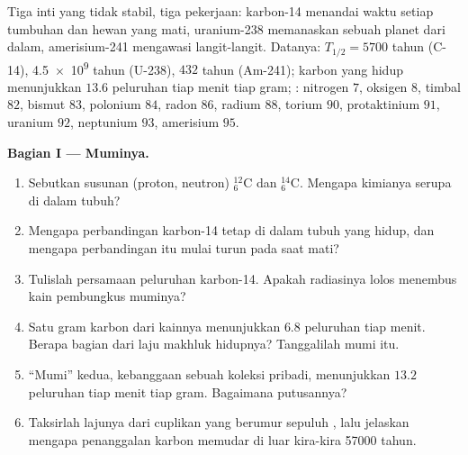 \begin{problem}
\label{pb:g11:nucleus-radioactivity:1}
Tiga inti yang tidak stabil, tiga pekerjaan: karbon-14 menandai waktu setiap
tumbuhan dan hewan yang mati, uranium-238 memanaskan sebuah planet dari
dalam, amerisium-241 mengawasi langit-langit. Datanya:
$T_{1/2} = \num{5700}$ tahun (C-14), \num{4.5e9} tahun (U-238), $432$ tahun
(Am-241); karbon yang hidup menunjukkan $13.6$ peluruhan tiap menit tiap
gram; : nitrogen $7$, oksigen $8$, timbal $82$, bismut $83$,
polonium $84$, radon $86$, radium $88$, torium $90$, protaktinium $91$,
uranium $92$, neptunium $93$, amerisium $95$.

\medskip
\noindent\textbf{Bagian I --- Muminya.}
\begin{enumerate}
  \item Sebutkan susunan (proton, neutron) ${}^{12}_{6}\mathrm{C}$ dan
        ${}^{14}_{6}\mathrm{C}$. Mengapa kimianya serupa di dalam tubuh?
  \item Mengapa perbandingan karbon-14 tetap di dalam tubuh yang hidup, dan
        mengapa perbandingan itu mulai turun pada saat mati?
  \item Tulislah persamaan peluruhan karbon-14. Apakah radiasinya lolos
        menembus kain pembungkus muminya?
  \item Satu gram karbon dari kainnya menunjukkan $6.8$ peluruhan tiap
        menit. Berapa bagian dari laju makhluk hidupnya? Tanggalilah mumi
        itu.
  \item ``Mumi'' kedua, kebanggaan sebuah koleksi pribadi, menunjukkan
        $13.2$ peluruhan tiap menit tiap gram. Bagaimana putusannya?
  \item Taksirlah lajunya dari cuplikan yang berumur sepuluh ,
        lalu jelaskan mengapa penanggalan karbon memudar di luar kira-kira
        \num{57000} tahun.
\end{enumerate}


\end{problem}
